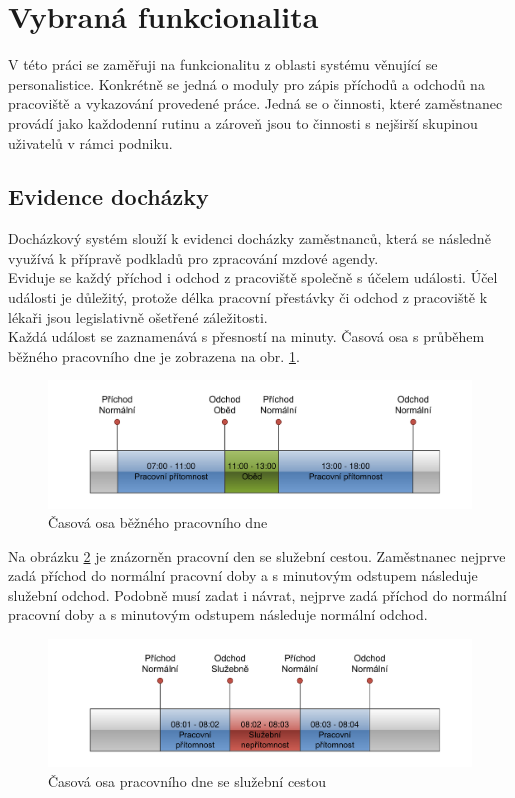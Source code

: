 \documentclass{diplomka}
\begin{document}
\section{Vybraná funkcionalita}
V této práci se zaměřuji na funkcionalitu z oblasti systému věnující se personalistice. Konkrétně se jedná o moduly pro zápis příchodů a odchodů na pracoviště a vykazování provedené práce. Jedná se o činnosti, které zaměstnanec provádí jako každodenní rutinu a zároveň jsou to činnosti s nejširší skupinou uživatelů v rámci podniku.
 
\subsection{Evidence docházky}
Docházkový systém slouží k evidenci docházky zaměstnanců, která se následně využívá k přípravě podkladů pro zpracování mzdové agendy.\\ \indent
Eviduje se každý příchod i odchod z pracoviště společně s účelem události. Účel události je důležitý, protože délka pracovní přestávky či odchod z pracoviště k lékaři jsou legislativně ošetřené záležitosti.\\ \indent Každá událost se zaznamenává s přesností na minuty. Časová osa s průběhem běžného pracovního dne je zobrazena na obr. \ref{fig:attn}.
\begin{figure}[H]
  \centering
  \includegraphics[scale=0.7]{visio/attnormal.pdf}
\caption{Časová osa běžného pracovního dne}
\label{fig:attn}
\end{figure}

Na obrázku \ref{fig:atts} je znázorněn pracovní den se služební cestou. Zaměstnanec nejprve zadá příchod do normální pracovní doby a s minutovým odstupem následuje služební odchod. Podobně musí zadat i návrat, nejprve zadá příchod do normální pracovní doby a s minutovým odstupem následuje normální odchod.
\begin{figure}[H]
  \centering
  \includegraphics[scale=0.7]{visio/attservice.pdf}
\caption{Časová osa pracovního dne se služební cestou}
\label{fig:atts}
\end{figure}
\end{document}
